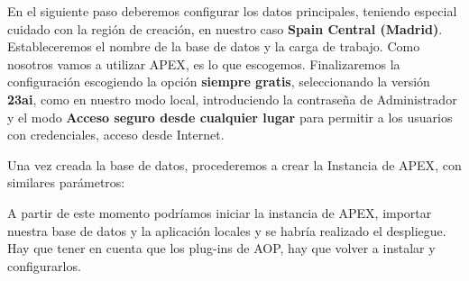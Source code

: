 En el siguiente paso deberemos configurar los datos principales, teniendo especial cuidado con la región de creación, en nuestro caso \textbf{Spain Central (Madrid)}.
Estableceremos el nombre de la base de datos y la carga de trabajo. Como nosotros vamos a utilizar \acrshort{APEX}, es lo que escogemos.
Finalizaremos la configuración escogiendo la opción \textbf{siempre gratis}, seleccionando la versión \textbf{23ai}, como en nuestro modo local, introduciendo la contraseña de Administrador y el modo \textbf{Acceso seguro desde cualquier lugar} para permitir a los usuarios con credenciales, acceso desde Internet.

Una vez creada la base de datos, procederemos a crear la Instancia de \acrshort{APEX}, con similares parámetros:


A partir de este momento podríamos iniciar la instancia de \acrshort{APEX}, importar nuestra base de datos y la aplicación locales y se habría realizado el despliegue. Hay que tener en cuenta que los plug-ins de \acrshort{AOP}, hay que volver a instalar y configurarlos. 